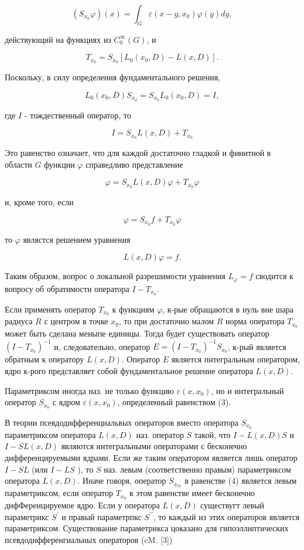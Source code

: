 \documentclass[10pt]{article}
\begin{document}
\[
\left(S_{x_{0}} \varphi\right)(x)=\int_{G} \varepsilon\left(x-y, x_{0}\right) \varphi(y) d y,
\]

действующий на функциях из $C_{0}^{\infty}(G)$, и

\[
T_{x_{0}}=S_{x_{0}}\left[L_{0}\left(x_{0}, D\right)-L(x, D)\right] .
\]

Поскольку, в силу определения фундаментального решения,

\[
L_{0}\left(x_{0}, D\right) S_{x_{0}}=S_{x_{0}} L_{0}\left(x_{0}, D\right)=I,
\]

где $I$ - тождественный оператор, то

\[
I=S_{x_{0}} L(x, D)+T_{x_{0}}
\]

Это равенство означает, что для каждой достаточно гладкой и финитной в области $G$ функции $\varphi$ справедливо представление

\[
\varphi=S_{x_{0}} L(x, D) \varphi+T_{x_{0}} \varphi
\]

и, кроме того, если

\[
\varphi=S_{x_{0}} f+T_{x_{0}} \varphi
\]

то $\varphi$ являстся решением уравнения

\[
L(x, D) \varphi=f .
\]

Таким образом, вопрос о локальной разрешимости уравнения $L_{\varphi}=f$ сводится к вопросу об обратимости оператора $I-T_{x_{0}}$.

Если применять оператор $T_{x_{0}}$ к функциям $\varphi$, к-рые обращаются в нуль вне шара радиуса $R$ с центром в точке $x_{0}$, то при достаточно малом $R$ норма оператора $T_{x_{0}}$ может быть сделана меныпе единицы. Тогда будет существовать оператор $\left(I-T_{x_{0}}\right)^{-1}$ и, следовательно, оператор $E=\left(I-T_{x_{0}}\right)^{-1} S_{x_{0}}$, к-рый является обратным к оператору $L(x, D)$. Оператор $E$ является пнтегральным оператором, ядро к-рого представляет собой фундаментальное решение оператора $L(x, D)$.

Параметриксом иногда наз. не только функцию $\varepsilon\left(x, x_{0}\right)$, но и интегральный оператор $S_{x_{0}}$ с ядром $\varepsilon\left(x, x_{0}\right)$, определенный равенством (3).

В теории псевдодифференциальвых операторов вместо оператора $S_{x_{0}}$ параметриксом оператора $L(x, D)$ наз. оператор $S$ такой, что $I-L(x, D) S$ и $I-S L(x, D)$ являются интегральными операторами с бесконечно дифференцируемыми ядрами. Если же таким оператором является лишь оператор $I-S L$ (или $I-L S$ ), то $S$ наз. левым (соответственно правым) параметриксом оператора $L(x, D)$. Иначе говоря, оператор $S_{x_{01}}$ в равенстве (4) является левым параметриксом, если оператор $T_{x_{0}}$ в этом равенстве имеет бесконечно дифФеренцируемое ядро. Если у оператора $L(x, D)$ существугт левый параметрикс $S^{\prime}$ и правый параметрпкс $S^{\prime \prime}$, то каждый из этих операторов является параметриксом. Существование параметрикса цоказано для гипоэллиптических псевдодифференгиальных операторов (cM. [3])
\end{document}
